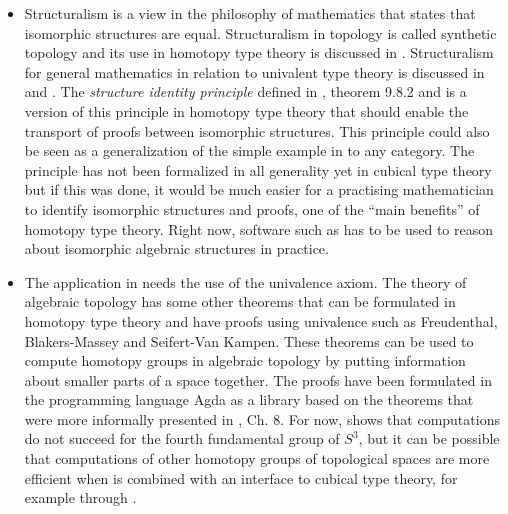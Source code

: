 \documentclass[12pt,a4paper,twoside,xetex]{book} %
\newcommand{\keyword}[1]{\emph{#1}\index{#1}}
\begin{document}
\begin{itemize}
\item Structuralism is a view in the philosophy of mathematics that states that isomorphic structures are equal. Structuralism in topology is called synthetic topology and its use in homotopy type theory is discussed in \cite{Shulman2017}. Structuralism for general mathematics in relation to univalent type theory is discussed in \cite{Awodey2014} and \cite{Tsementzis2016}. The \keyword{structure identity principle} defined in 
\cite{Voevodsky2013}, theorem 9.8.2 and \cite{Aczel2012} is a version of this principle in homotopy type theory that should enable the transport of proofs between isomorphic structures. This principle could also be seen as a 
generalization of the simple example in  to any category. The 
principle has not been formalized in all generality yet in cubical type theory 
but if this was done, it would be much easier for a practising mathematician to 
identify isomorphic structures and proofs, one of the ``main benefits'' of homotopy type theory. Right now, software such as \cite{TheGAPGroup2018} has to be used to reason about isomorphic algebraic structures in practice. 

\item The application in  needs the use of the univalence 
axiom. The theory of algebraic topology has some other theorems that can be 
formulated in homotopy type theory and have proofs using univalence such as 
Freudenthal, Blakers-Massey and Seifert-Van Kampen. These theorems can be used 
to compute homotopy groups in algebraic topology by putting information about 
smaller parts of a space together. The proofs have been formulated in the 
programming language Agda as a library \cite{HoBr17} based on the theorems that 
were more informally presented in \cite{Voevodsky2013}, Ch. 8. For now, 
 shows that computations do not succeed for the fourth 
fundamental group of $S^3$, but it can be possible that computations of other 
homotopy groups of topological spaces are more efficient when \cite{HoBr17} is 
combined with an interface to cubical type theory, for example through 
\cite{Moertberg2018}.



\end{itemize}
\end{document}
